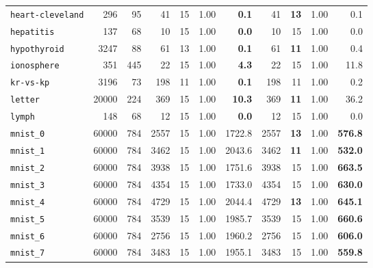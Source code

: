 \begin{tabular}{lccrrrrrrrr}
\texttt{heart-cleveland} & \multicolumn{1}{r}{296} & \multicolumn{1}{r}{95}  & 41 & 15 & 1.00 & \textbf{0.1} & 41 & \textbf{13} & 1.00 & 0.1\\
\texttt{hepatitis} & \multicolumn{1}{r}{137} & \multicolumn{1}{r}{68}  & 10 & 15 & 1.00 & \textbf{0.0} & 10 & 15 & 1.00 & 0.0\\
\texttt{hypothyroid} & \multicolumn{1}{r}{3247} & \multicolumn{1}{r}{88}  & 61 & 13 & 1.00 & \textbf{0.1} & 61 & \textbf{11} & 1.00 & 0.4\\
\texttt{ionosphere} & \multicolumn{1}{r}{351} & \multicolumn{1}{r}{445}  & 22 & 15 & 1.00 & \textbf{4.3} & 22 & 15 & 1.00 & 11.8\\
\texttt{kr-vs-kp} & \multicolumn{1}{r}{3196} & \multicolumn{1}{r}{73}  & 198 & 11 & 1.00 & \textbf{0.1} & 198 & 11 & 1.00 & 0.2\\
\texttt{letter} & \multicolumn{1}{r}{20000} & \multicolumn{1}{r}{224}  & 369 & 15 & 1.00 & \textbf{10.3} & 369 & \textbf{11} & 1.00 & 36.2\\
\texttt{lymph} & \multicolumn{1}{r}{148} & \multicolumn{1}{r}{68}  & 12 & 15 & 1.00 & \textbf{0.0} & 12 & 15 & 1.00 & 0.0\\
\texttt{mnist\_0} & \multicolumn{1}{r}{60000} & \multicolumn{1}{r}{784}  & 2557 & 15 & 1.00 & 1722.8 & 2557 & \textbf{13} & 1.00 & \textbf{576.8}\\
\texttt{mnist\_1} & \multicolumn{1}{r}{60000} & \multicolumn{1}{r}{784}  & 3462 & 15 & 1.00 & 2043.6 & 3462 & \textbf{11} & 1.00 & \textbf{532.0}\\
\texttt{mnist\_2} & \multicolumn{1}{r}{60000} & \multicolumn{1}{r}{784}  & 3938 & 15 & 1.00 & 1751.6 & 3938 & 15 & 1.00 & \textbf{663.5}\\
\texttt{mnist\_3} & \multicolumn{1}{r}{60000} & \multicolumn{1}{r}{784}  & 4354 & 15 & 1.00 & 1733.0 & 4354 & 15 & 1.00 & \textbf{630.0}\\
\texttt{mnist\_4} & \multicolumn{1}{r}{60000} & \multicolumn{1}{r}{784}  & 4729 & 15 & 1.00 & 2044.4 & 4729 & \textbf{13} & 1.00 & \textbf{645.1}\\
\texttt{mnist\_5} & \multicolumn{1}{r}{60000} & \multicolumn{1}{r}{784}  & 3539 & 15 & 1.00 & 1985.7 & 3539 & 15 & 1.00 & \textbf{660.6}\\
\texttt{mnist\_6} & \multicolumn{1}{r}{60000} & \multicolumn{1}{r}{784}  & 2756 & 15 & 1.00 & 1960.2 & 2756 & 15 & 1.00 & \textbf{606.0}\\
\texttt{mnist\_7} & \multicolumn{1}{r}{60000} & \multicolumn{1}{r}{784}  & 3483 & 15 & 1.00 & 1955.1 & 3483 & 15 & 1.00 & \textbf{559.8}\\

\end{tabular}
